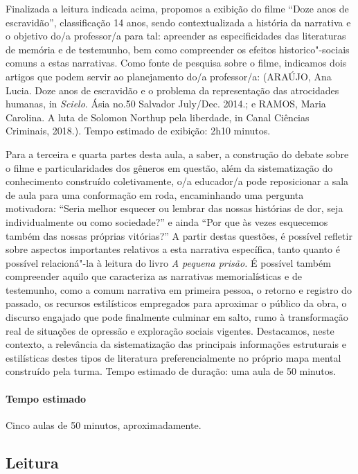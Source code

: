 \documentclass[11pt]{extarticle}
\begin{document}
Finalizada a leitura indicada acima, propomos a exibição do filme ``Doze
anos de escravidão'', classificação 14 anos, sendo contextualizada a
história da narrativa e o objetivo do/a professor/a para tal: apreender
as especificidades das literaturas de memória e de testemunho, bem como
compreender os efeitos historico"-sociais comuns a estas narrativas. Como
fonte de pesquisa sobre o filme, indicamos dois artigos que podem servir
ao planejamento do/a professor/a: (ARAÚJO, Ana Lucia. Doze anos de
escravidão e o problema da representação das atrocidades humanas, in
\emph{Scielo}. Ásia no.50 Salvador July/Dec. 2014.; e RAMOS, Maria
Carolina. A luta de Solomon Northup pela liberdade, in Canal Ciências
Criminais, 2018.). Tempo estimado de exibição: 2h10 minutos.

Para a terceira e quarta partes desta aula, a saber, a construção do
debate sobre o filme e particularidades dos gêneros em questão, além da
sistematização do conhecimento construído coletivamente, o/a educador/a
pode reposicionar a sala de aula para uma conformação em roda,
encaminhando uma pergunta motivadora: ``Seria melhor esquecer ou lembrar
das nossas histórias de dor, seja individualmente ou como sociedade?'' e
ainda ``Por que às vezes esquecemos também das nossas próprias vitórias?''
A partir destas questões, é possível refletir sobre aspectos importantes
relativos a esta narrativa específica, tanto quanto é possível
relacioná"-la à leitura do livro \emph{A pequena prisão.} É possível
também compreender aquilo que caracteriza as narrativas memorialísticas
e de testemunho, como a comum narrativa em primeira pessoa, o retorno e
registro do passado, os recursos estilísticos empregados para aproximar
o público da obra, o discurso engajado que pode finalmente culminar em
salto, rumo à transformação real de situações de opressão e exploração
sociais vigentes. Destacamos, neste contexto, a relevância da
sistematização das principais informações estruturais e estilísticas
destes tipos de literatura preferencialmente no próprio mapa mental
construído pela turma. Tempo estimado de duração: uma aula de 50
minutos.

\paragraph{Tempo estimado} Cinco aulas de 50 minutos,
aproximadamente.


\subsection{Leitura}
\end{document}
